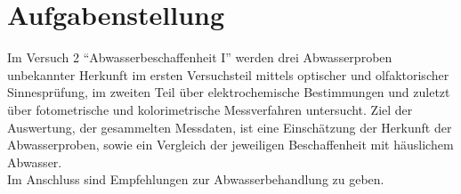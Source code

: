 \chapter{Aufgabenstellung}
\label{sec:aufgabenstellung}

Im Versuch 2 "`Abwasserbeschaffenheit I"' werden drei Abwasserproben unbekannter Herkunft im ersten Versuchsteil mittels optischer und olfaktorischer Sinnesprüfung, im zweiten Teil über elektrochemische Bestimmungen und zuletzt über fotometrische und kolorimetrische Messverfahren  untersucht.\linebreak
Ziel der Auswertung, der gesammelten Messdaten, ist eine Einschätzung der Herkunft der Abwasserproben, sowie ein Vergleich der jeweiligen Beschaffenheit mit häuslichem Abwasser. \\
Im Anschluss sind Empfehlungen zur Abwasserbehandlung zu geben.